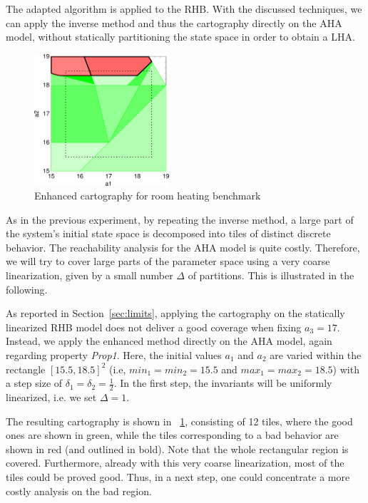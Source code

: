 \documentclass{llncs}
\newcommand{\sectionname}{Section}
\begin{document}
\begin{example}
  The adapted algorithm is applied to the RHB. With the discussed
  techniques, we can apply the inverse method and thus the cartography
  directly on the AHA model, without statically partitioning the
  state space in order to obtain a LHA. 

  \begin{figure}[t]
    \centering
    \includegraphics[width=5cm]{images/good-bad.pdf}
    \caption{Enhanced cartography for room heating benchmark}\label{fig:rhbcart}
  \end{figure}

  As in the previous experiment, by repeating the inverse method, a
  large part of the system's initial state space is decomposed
  into tiles of distinct discrete behavior. The reachability analysis
  for the AHA model is quite costly. Therefore, we will try to cover
  large parts of the parameter space using a very coarse
  linearization, given by a small number $\Delta$ of partitions.  This
  is illustrated in the following.

  As reported in \sectionname~\ref{sec:limits}, applying the cartography on
  the statically linearized RHB model does not deliver a good coverage
  when fixing $a_3 = 17$. Instead, we apply the enhanced method
  directly on the AHA model, again regarding property
  \textit{Prop1}. Here, the initial values $a_1$ and $a_2$ are varied
  within the rectangle $[15.5,18.5]^2$ (i.e, $min_1=min_2=15.5$ and
  $max_1=max_2=18.5$) with a step size of
  $\delta_1=\delta_2=\frac{1}{2}$. In the first step, the invariants
  will be uniformly linearized, i.e. we set $\Delta=1$.

  The resulting cartography is shown in \figurename~\ref{fig:rhbcart},
  consisting of 12 tiles, where the good ones are shown in green,
  while the tiles corresponding to a bad behavior are shown in red
  (and outlined in bold). Note that the whole rectangular region is
  covered. Furthermore, already with this very coarse linearization,
  most of the tiles could be proved good. Thus, in a next step, one
  could concentrate a more costly analysis on the bad region.
\end{example}
\end{document}
